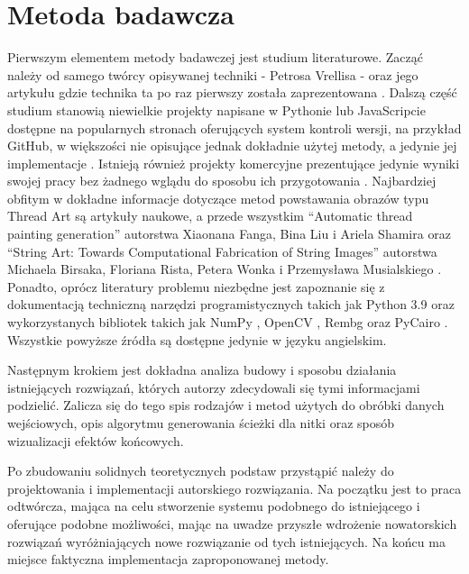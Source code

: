     \section{Metoda badawcza} \label{intro-method}
    Pierwszym elementem metody badawczej jest studium literaturowe. Zacząć należy od samego twórcy opisywanej techniki - Petrosa Vrellisa - oraz jego artykułu gdzie technika ta po raz pierwszy została zaprezentowana \cite{new-way-to-knit}. Dalszą część studium stanowią niewielkie projekty napisane w Pythonie lub JavaScripcie dostępne na popularnych stronach oferujących system kontroli wersji, na przykład GitHub, w większości nie opisujące jednak dokładnie użytej metody, a jedynie jej implementacje \cite{callum-github} \cite{jenny-github}. Istnieją również projekty komercyjne prezentujące jedynie wyniki swojej pracy bez żadnego wglądu do sposobu ich przygotowania \cite{artrapid}. Najbardziej obfitym w dokładne informacje dotyczące metod powstawania obrazów typu Thread Art są artykuły naukowe, a przede wszystkim ``Automatic thread painting generation'' autorstwa Xiaonana Fanga, Bina Liu i Ariela Shamira \cite{article-string-art-xiaonan} oraz ``String Art: Towards Computational Fabrication of String Images'' autorstwa Michaela Birsaka, Floriana Rista, Petera Wonka i Przemysława Musialskiego \cite{article-string-art-birsak}. Ponadto, oprócz literatury problemu niezbędne jest zapoznanie się z dokumentacją techniczną narzędzi programistycznych takich jak Python 3.9 \cite{python39} oraz wykorzystanych bibliotek takich jak NumPy \cite{numpy}, OpenCV \cite{opencv}, Rembg \cite{rembg} oraz PyCairo \cite{pycairo}. Wszystkie powyższe źródła są dostępne jedynie w języku angielskim. 
    
    Następnym krokiem jest dokładna analiza budowy i sposobu działania istniejących rozwiązań, których autorzy zdecydowali się tymi informacjami podzielić. Zalicza się do tego spis rodzajów i metod użytych do obróbki danych wejściowych, opis algorytmu generowania ścieżki dla nitki oraz sposób wizualizacji efektów końcowych.
    
    Po zbudowaniu solidnych teoretycznych podstaw przystąpić należy do projektowania i implementacji autorskiego rozwiązania. Na początku jest to praca odtwórcza, mająca na celu stworzenie systemu podobnego do istniejącego i oferujące podobne możliwości, mając na uwadze przyszłe wdrożenie nowatorskich rozwiązań wyróżniających nowe rozwiązanie od tych istniejących. Na końcu ma miejsce faktyczna implementacja zaproponowanej metody.
    
